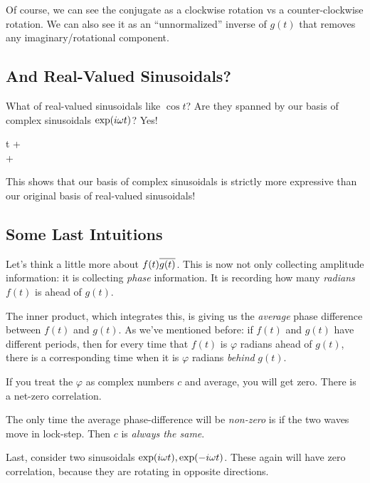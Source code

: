 Of course, we can see the conjugate as a clockwise rotation vs a
counter-clockwise rotation. We can also see it as an ``unnormalized''
inverse of $g(t)$ that removes any imaginary/rotational component.

\subsection{And Real-Valued Sinusoidals?}

What of real-valued sinusoidals like $\cos t$? Are they spanned by our
basis of complex sinusoidals $\exp\mathopen{}\left( {i\omega t} \right)\mathclose{}$? Yes!

\begin{nedqn}
  \cos \omega t
\eqcol
  \half {}
  +
  \half {}
\\\eqcol
  \half
  +
  \half
\\\eqcol
\end{nedqn}

This shows that our basis of complex sinusoidals is strictly more
expressive than our original basis of real-valued sinusoidals!

\subsection{Some Last Intuitions}

Let's think a little more about $f(t)\overline{g(t)}$. This is now not only
collecting amplitude information: it is collecting \emph{phase}
information. It is recording how many \emph{radians} $f(t)$ is ahead of
$g(t)$.

The inner product, which integrates this, is giving us the
\emph{average} phase difference between $f(t)$ and $g(t)$. As we've
mentioned before: if $f(t)$ and $g(t)$ have different periods, then for
every time that $f(t)$ is $\varphi$ radians ahead of $g(t)$, there is a
corresponding time when it is $\varphi$ radians \emph{behind} $g(t)$.

If you treat the $\varphi$ as complex numbers $c$ and average, you will
get zero. There is a net-zero correlation.

The only time the average phase-difference will be \emph{non-zero} is if
the two waves move in lock-step. Then $c$ is \emph{always the same}.

Last, consider two sinusoidals $\exp\mathopen{}\left( {i\omega t} \right)\mathclose{}, \exp\mathopen{}\left( {-i\omega t} \right)\mathclose{}$.
These again will have zero correlation, because they are rotating in
opposite directions.
